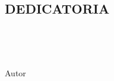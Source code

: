 \pagestyle{fancy}
\begin{center}
    \vspace*{\fill}
        \begin{center}
                \section*{\Large{\textbf{DEDICATORIA}}}
                \begin{justify}
                    \lipsum[2][1-10]\\
                \end{justify}

                \begin{justify}
                    \lipsum[2][1-9]\\
                \end{justify}
            
                \begin{flushright}
                    Autor
                \end{flushright}
        \end{center}
    \vfill %
\end{center}